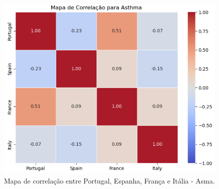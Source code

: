 \documentclass[conference]{IEEEtran}
\begin{document}
%
%
%
%


\begin{figure}
	\centering
	\includegraphics[width=0.9\linewidth]{Mapa_Correlacao_Asma}
	\caption{Mapa de correlação entre Portugal, Espanha, França e Itália - Asma.}
	\label{fig:mapacorrelacaoasma}
\end{figure}
\end{document}
